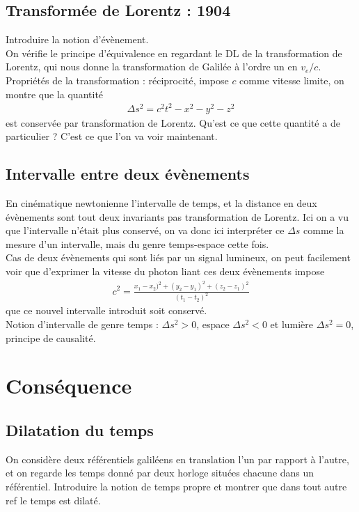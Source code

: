 \documentclass[12pt,prb,aps,epsf]{article}
\begin{document}
 \subsection{Transformée de Lorentz : 1904}
 Introduire la notion d'évènement. \\
 On vérifie le principe d'équivalence en regardant le DL de la transformation de Lorentz, qui nous donne la transformation de Galilée à l'ordre un en $v_e/c$.\\
 
 Propriétés de la transformation : réciprocité, impose $c$ comme vitesse limite, on montre que la quantité 
 \begin{eqnarray}
 \Delta s^2 = c^2t^2 -x^2-y^2-z^2
 \end{eqnarray}
est conservée par transformation de Lorentz. Qu'est ce que cette quantité a de particulier ? C'est ce que l'on va voir maintenant.

\subsection{Intervalle entre deux évènements}
En cinématique newtonienne l'intervalle de temps, et la distance en deux évènements sont tout deux invariants pas transformation de Lorentz. Ici on a vu que l'intervalle n'était plus conservé, on va donc ici interpréter ce $\Delta s$ comme la mesure d'un intervalle, mais du genre temps-espace cette fois.\\

Cas de deux évènements qui sont liés par un signal lumineux, on peut facilement voir que d'exprimer la vitesse du photon liant ces deux évènements impose 
\begin{eqnarray}
c^2 = \frac{x_1-x_2)^2 + (y_2-y_1)^2 + (z_2-z_1)^2}{(t_1-t_2)^2}
\end{eqnarray}
que ce nouvel intervalle introduit soit conservé.\\

Notion d'intervalle de genre temps : $\Delta s^2>0$, espace $\Delta s^2<0$ et lumière $\Delta s ^2 = 0$, principe de causalité.

\section{Conséquence}
\subsection{Dilatation du temps}
On considère deux référentiels galiléens en translation l'un par rapport à l'autre, et on regarde les temps donné par deux horloge situées chacune dans un référentiel. Introduire la notion de temps propre et montrer que dans tout autre ref le temps est dilaté.\\
\end{document}
